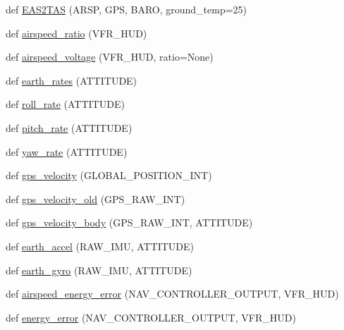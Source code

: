 \begin{DoxyCompactItemize}
\item 
def \hyperlink{namespacepymavlink_1_1mavextra_a7d43fc6d74cca81b49d9528bfbe97193}{E\+A\+S2\+T\+AS} (A\+R\+SP, G\+PS, B\+A\+RO, ground\+\_\+temp=25)
\item 
def \hyperlink{namespacepymavlink_1_1mavextra_a9bc2701bc2b4da0a2e4ee303c7cecf65}{airspeed\+\_\+ratio} (V\+F\+R\+\_\+\+H\+UD)
\item 
def \hyperlink{namespacepymavlink_1_1mavextra_a7e374b6fd195ee7b8efbffb17cbf84b7}{airspeed\+\_\+voltage} (V\+F\+R\+\_\+\+H\+UD, ratio=None)
\item 
def \hyperlink{namespacepymavlink_1_1mavextra_ada9a5936b18dd8a99085b06b9b687573}{earth\+\_\+rates} (A\+T\+T\+I\+T\+U\+DE)
\item 
def \hyperlink{namespacepymavlink_1_1mavextra_ad1a6d8f7d2affd450da8c9a6a3d36e05}{roll\+\_\+rate} (A\+T\+T\+I\+T\+U\+DE)
\item 
def \hyperlink{namespacepymavlink_1_1mavextra_aee61cc54c7330f81c44bc7d477e18f3a}{pitch\+\_\+rate} (A\+T\+T\+I\+T\+U\+DE)
\item 
def \hyperlink{namespacepymavlink_1_1mavextra_af1b42c28fc778624954bc9bb5307fcf6}{yaw\+\_\+rate} (A\+T\+T\+I\+T\+U\+DE)
\item 
def \hyperlink{namespacepymavlink_1_1mavextra_a42f6635bebc5b76277d38e5dcbdd8c4f}{gps\+\_\+velocity} (G\+L\+O\+B\+A\+L\+\_\+\+P\+O\+S\+I\+T\+I\+O\+N\+\_\+\+I\+NT)
\item 
def \hyperlink{namespacepymavlink_1_1mavextra_aee56305fd91e4db7b5b0a35725659c1c}{gps\+\_\+velocity\+\_\+old} (G\+P\+S\+\_\+\+R\+A\+W\+\_\+\+I\+NT)
\item 
def \hyperlink{namespacepymavlink_1_1mavextra_aee6ba92874105e32ba57d9449475661d}{gps\+\_\+velocity\+\_\+body} (G\+P\+S\+\_\+\+R\+A\+W\+\_\+\+I\+NT, A\+T\+T\+I\+T\+U\+DE)
\item 
def \hyperlink{namespacepymavlink_1_1mavextra_a3c2fd630569590cbbdb6fc602eb242b4}{earth\+\_\+accel} (R\+A\+W\+\_\+\+I\+MU, A\+T\+T\+I\+T\+U\+DE)
\item 
def \hyperlink{namespacepymavlink_1_1mavextra_ad31722417bd0b051505d2a9f7e70183a}{earth\+\_\+gyro} (R\+A\+W\+\_\+\+I\+MU, A\+T\+T\+I\+T\+U\+DE)
\item 
def \hyperlink{namespacepymavlink_1_1mavextra_ac195697770b7a0067e109293778a73e1}{airspeed\+\_\+energy\+\_\+error} (N\+A\+V\+\_\+\+C\+O\+N\+T\+R\+O\+L\+L\+E\+R\+\_\+\+O\+U\+T\+P\+UT, V\+F\+R\+\_\+\+H\+UD)
\item 
def \hyperlink{namespacepymavlink_1_1mavextra_a5b8fa5473a3b0961f0a53ab1edd02dc1}{energy\+\_\+error} (N\+A\+V\+\_\+\+C\+O\+N\+T\+R\+O\+L\+L\+E\+R\+\_\+\+O\+U\+T\+P\+UT, V\+F\+R\+\_\+\+H\+UD)

\end{DoxyCompactItemize}
